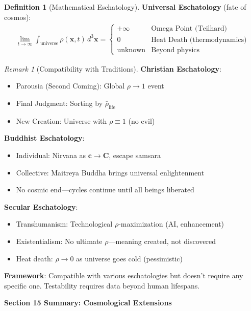 \documentclass[11pt,a4paper]{article}
\theoremstyle{definition}
\newtheorem{definition}{Definition}[section]
\theoremstyle{remark}
\newtheorem{remark}{Remark}[section]
\newcommand{\cc}{\mathbf{c}}
\begin{document}
\begin{enumerate}
\begin{definition}[Mathematical Eschatology]
\textbf{Universal Eschatology} (fate of cosmos):
\begin{align}
\lim_{t \to \infty} \int_{\text{universe}} \rho(\mathbf{x}, t) \, d^3\mathbf{x} = \begin{cases}
+\infty & \text{Omega Point (Teilhard)} \\
0 & \text{Heat Death (thermodynamics)} \\
\text{unknown} & \text{Beyond physics}
\end{cases}
\end{align}
\end{definition}

\begin{remark}[Compatibility with Traditions]
\textbf{Christian Eschatology}:
\begin{itemize}
    \item Parousia (Second Coming): Global \(\rho \to 1\) event
    \item Final Judgment: Sorting by \(\bar{\rho}_{\text{life}}\)
    \item New Creation: Universe with \(\rho \equiv 1\) (no evil)
\end{itemize}

\textbf{Buddhist Eschatology}:
\begin{itemize}
    \item Individual: Nirvana as \(\cc \to \mathbf{C}\), escape samsara
    \item Collective: Maitreya Buddha brings universal enlightenment
    \item No cosmic end—cycles continue until all beings liberated
\end{itemize}

\textbf{Secular Eschatology}:
\begin{itemize}
    \item Transhumanism: Technological \(\rho\)-maximization (AI, enhancement)
    \item Existentialism: No ultimate \(\rho\)—meaning created, not discovered
    \item Heat death: \(\rho \to 0\) as universe goes cold (pessimistic)
\end{itemize}

\textbf{Framework}: Compatible with various eschatologies but doesn't require any specific one. Testability requires data beyond human lifespans.
\end{remark}

\begin{mdframed}[backgroundcolor=green!10,linewidth=2pt,linecolor=green!70!black]
\textbf{Section 15 Summary: Cosmological Extensions}


\end{mdframed}
\end{enumerate}
\end{document}
